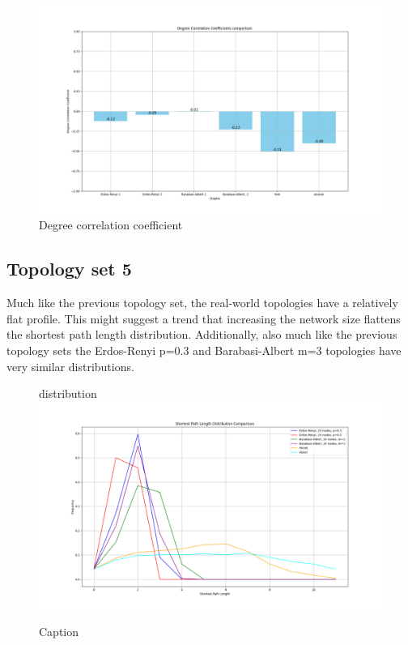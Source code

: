 \begin{figure}
    \centering
    \includegraphics[width=0.9\linewidth]{images/FINAL-TOPO-COMP/Degree-correlation-coeff/deg-coeff-23.png}
    \caption{Degree correlation coefficient}
    \label{fig:enter-label}
\end{figure}

\subsection{Topology set 5}
Much like the previous topology set, the real-world topologies have a relatively flat profile. This might suggest a trend that increasing the network size flattens the shortest path length distribution. Additionally, also much like the previous topology sets the Erdos-Renyi p=0.3 and Barabasi-Albert m=3 topologies have very similar distributions. 
\begin{figure}
    \centering
    distribution \includegraphics[width=0.9\linewidth]{images/FINAL-TOPO-COMP/line-24.png}
    \caption{Caption}
    \label{fig:enter-label}
\end{figure}

